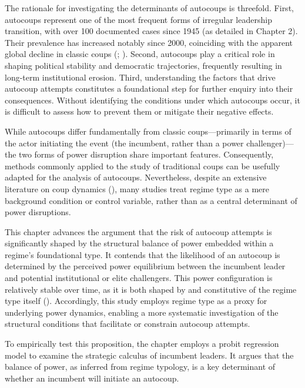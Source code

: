 \documentclass[
  12pt,
]{report}
\begin{document}
The rationale for investigating the determinants of autocoups is
threefold. First, autocoups represent one of the most frequent forms of
irregular leadership transition, with over 100 documented cases since
1945 (as detailed in Chapter 2). Their prevalence has increased notably
since 2000, coinciding with the apparent global decline in classic coups
(; ). Second, autocoups play a critical role in shaping
political stability and democratic trajectories, frequently resulting in
long-term institutional erosion. Third, understanding the factors that
drive autocoup attempts constitutes a foundational step for further
enquiry into their consequences. Without identifying the conditions
under which autocoups occur, it is difficult to assess how to prevent
them or mitigate their negative effects.

While autocoups differ fundamentally from classic coups---primarily in
terms of the actor initiating the event (the incumbent, rather than a
power challenger)---the two forms of power disruption share important
features. Consequently, methods commonly applied to the study of
traditional coups can be usefully adapted for the analysis of autocoups.
Nevertheless, despite an extensive literature on coup dynamics
(), many
studies treat regime type as a mere background condition or control
variable, rather than as a central determinant of power disruptions.

This chapter advances the argument that the risk of autocoup attempts is
significantly shaped by the structural balance of power embedded within
a regime's foundational type. It contends that the likelihood of an
autocoup is determined by the perceived power equilibrium between the
incumbent leader and potential institutional or elite challengers. This
power configuration is relatively stable over time, as it is both shaped
by and constitutive of the regime type itself
().
Accordingly, this study employs regime type as a proxy for underlying
power dynamics, enabling a more systematic investigation of the
structural conditions that facilitate or constrain autocoup attempts.

To empirically test this proposition, the chapter employs a probit
regression model to examine the strategic calculus of incumbent leaders.
It argues that the balance of power, as inferred from regime typology,
is a key determinant of whether an incumbent will initiate an autocoup.
\end{document}
